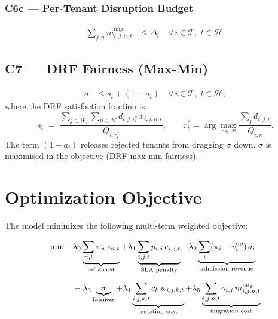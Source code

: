 \documentclass[11pt,a4paper]{article}
\newcommand{\cT}{\mathcal{T}}           %
\newcommand{\cW}{\mathcal{W}}           %
\newcommand{\cN}{\mathcal{N}}           %
\newcommand{\cR}{\mathcal{R}}           %
\newcommand{\cH}{\mathcal{H}}           %
\begin{document}
\subsubsection*{C6c --- Per-Tenant Disruption Budget}
\begin{align}
  \sum_{j,n} m_{i,j,n,t}^{\text{mig}}
  &\le \Delta_i
  \quad \forall\,i\in\cT,\;t\in\cH.
  \tag{C6c}
\end{align}

\subsection{C7 --- DRF Fairness (Max-Min)}
\label{sec:c7}

\begin{align}
  \sigma &\le s_i + (1 - a_i)
  \quad \forall\,i\in\cT,\;t\in\cH,
  \tag{C7}
\end{align}
where the DRF satisfaction fraction is
\[
  s_i \;=\;
  \frac{\displaystyle\sum_{j\in\cW_i}\sum_{n\in\cN}
        d_{i,j,r^*_i}\,x_{i,j,n,t}}{Q_{i,r^*_i}},
  \qquad
  r^*_i = \arg\max_{r\in\cR}\frac{\sum_j d_{i,j,r}}{Q_{i,r}}.
\]
The term $(1-a_i)$ releases rejected tenants from dragging $\sigma$ down.
$\sigma$ is maximised in the objective (DRF max-min fairness).

\section{Optimization Objective}

The model minimizes the following multi-term weighted objective:

\begin{align}
  \min \quad
  &\lambda_0 \underbrace{\sum_{n,t} \pi_n\,z_{n,t}}_{\text{infra cost}}
  +\lambda_1 \underbrace{\sum_{i,j,t} p_{i,j}\,e_{i,j,t}}_{\text{SLA penalty}}
  -\lambda_2 \underbrace{\sum_i (\bar{\pi}_i - v_i^{\text{op}})\,a_i}_{\text{admission revenue}}
  \notag\\[6pt]
  &-\lambda_3 \underbrace{\sigma}_{\text{fairness}}
  +\lambda_4 \underbrace{\sum_{i,j,k,t} c_k\,w_{i,j,k,t}}_{\text{isolation cost}}
  +\lambda_5 \underbrace{\sum_{i,j,n,t} \gamma_{i,j}\,m_{i,j,n,t}^{\text{mig}}}_{\text{migration cost}}
  \label{eq:obj}
\end{align}
\end{document}
